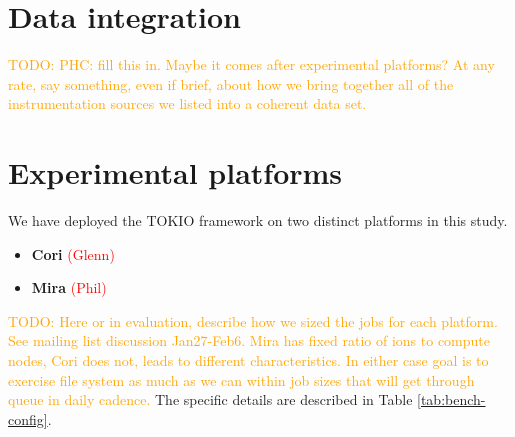 \documentclass[conference,10pt,compsocconf]{IEEEtran}
\newcommand{\assign}[1]{\textcolor{red}{(#1)}}
\newcommand{\todo}[1]{\textcolor{Orange}{TODO: #1}}
\begin{document}
\section{Data integration}

\todo{PHC: fill this in.  Maybe it comes after experimental platforms?  At
any rate, say something, even if brief, about how we bring together all of
the instrumentation sources we listed into a coherent data set.}

\section{Experimental platforms} \label{sec:platforms}

We have deployed the TOKIO framework on two distinct platforms in this study.

\begin{itemize}
\item \textbf{Cori} \assign{Glenn}
\item \textbf{Mira} \assign{Phil}
\end{itemize}

\todo{Here or in evaluation, describe how we sized the jobs for each
platform.  See mailing list discussion Jan27-Feb6.  Mira has fixed ratio of
ions to compute nodes, Cori does not, leads to different characteristics.  In
either case goal is to exercise file system as much as we can within job
sizes that will get through queue in daily cadence.}  The specific details are
described in Table \ref{tab:bench-config}.
\end{document}
